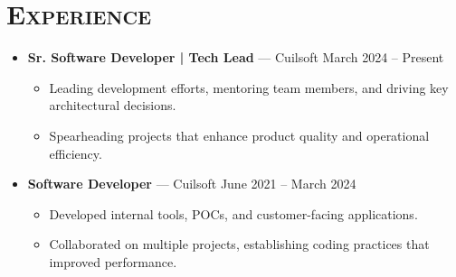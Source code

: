 \documentclass[a4paper,10pt]{article}
\newcommand{\resumesection}[1]{\section*{\scshape{#1}}}
\newcommand{\resumeitem}[2]{\item \textbf{#1} --- #2}
\begin{document}
\resumesection{Experience}
\begin{itemize}[leftmargin=0.5cm]
  \resumeitem{Sr. Software Developer | Tech Lead}{Cuilsoft \hfill March 2024 -- Present}
  \begin{itemize}[leftmargin=0.5cm]
    \item Leading development efforts, mentoring team members, and driving key architectural decisions.
    \item Spearheading projects that enhance product quality and operational efficiency.
  \end{itemize}

  \resumeitem{Software Developer}{Cuilsoft \hfill June 2021 -- March 2024}
  \begin{itemize}[leftmargin=0.5cm]
    \item Developed internal tools, POCs, and customer-facing applications.
    \item Collaborated on multiple projects, establishing coding practices that improved performance.
  \end{itemize}
\end{itemize}
\end{document}
